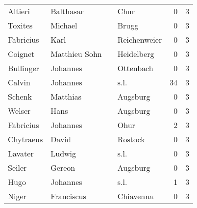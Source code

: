 \begin{tabular}{llllrr}
                  Altieri &                          Balthasar &             &                                        Chur &          0 &         3 \\
                  Toxites &                            Michael &             &                                       Brugg &          0 &         3 \\
                Fabricius &                               Karl &             &                                Reichenweier &          0 &         3 \\
                  Coignet &                      Matthieu Sohn &             &                                  Heidelberg &          0 &         3 \\
                Bullinger &                           Johannes &             &                                   Ottenbach &          0 &         3 \\
                   Calvin &                           Johannes &             &                                        s.l. &         34 &         3 \\
                   Schenk &                           Matthias &             &                                    Augsburg &          0 &         3 \\
                   Welser &                               Hans &             &                                    Augsburg &          0 &         3 \\
                Fabricius &                           Johannes &             &                                        Ohur &          2 &         3 \\
                Chytraeus &                              David &             &                                     Rostock &          0 &         3 \\
                  Lavater &                             Ludwig &             &                                        s.l. &          0 &         3 \\
                   Seiler &                             Gereon &             &                                    Augsburg &          0 &         3 \\
                     Hugo &                           Johannes &             &                                        s.l. &          1 &         3 \\
                    Niger &                         Franciscus &             &                                   Chiavenna &          0 &         3 \\

\end{tabular}
